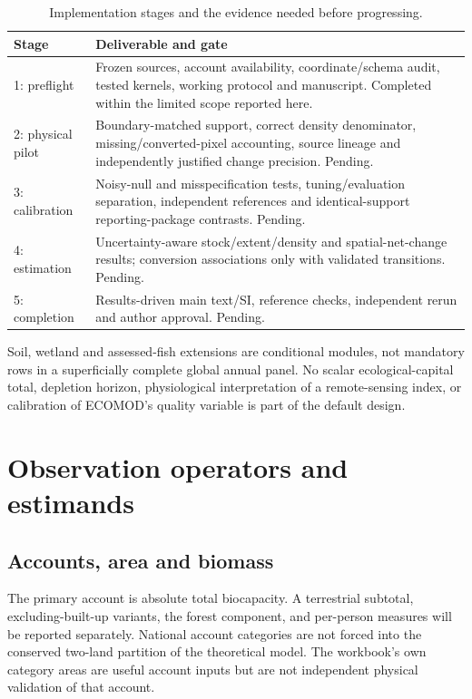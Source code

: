 \documentclass[11pt,a4paper]{article}
\begin{document}
\begin{table}[htbp]\centering\small
\caption{Implementation stages and the evidence needed before progressing.}
\begin{tabularx}{\textwidth}{p{}X}
\toprule
Stage & Deliverable and gate\\\midrule
1: preflight & Frozen sources, account availability, coordinate/schema audit, tested kernels, working protocol and manuscript. Completed within the limited scope reported here.\\
2: physical pilot & Boundary-matched support, correct density denominator, missing/converted-pixel accounting, source lineage and independently justified change precision. Pending.\\
3: calibration & Noisy-null and misspecification tests, tuning/evaluation separation, independent references and identical-support reporting-package contrasts. Pending.\\
4: estimation & Uncertainty-aware stock/extent/density and spatial-net-change results; conversion associations only with validated transitions. Pending.\\
5: completion & Results-driven main text/SI, reference checks, independent rerun and author approval. Pending.\\\bottomrule
\end{tabularx}\end{table}

Soil, wetland and assessed-fish extensions are conditional modules, not mandatory rows in a superficially complete global annual panel. No scalar ecological-capital total, depletion horizon, physiological interpretation of a remote-sensing index, or calibration of ECOMOD's quality variable is part of the default design.

\section{Observation operators and estimands}
\subsection{Accounts, area and biomass}
The primary account is absolute total biocapacity. A terrestrial subtotal, excluding-built-up variants, the forest component, and per-person measures will be reported separately. National account categories are not forced into the conserved two-land partition of the theoretical model. The workbook's own category areas are useful account inputs but are not independent physical validation of that account.
\end{document}
